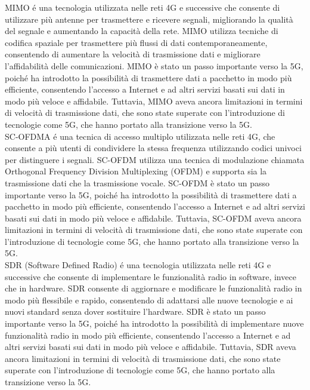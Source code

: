 MIMO é una tecnologia utilizzata nelle reti 4G e successive che consente di utilizzare più antenne per trasmettere e ricevere segnali, migliorando la qualità del segnale e aumentando la capacità della rete. MIMO utilizza tecniche di codifica spaziale per trasmettere più flussi di dati contemporaneamente, consentendo di aumentare la velocità di trasmissione dati e migliorare l'affidabilità delle comunicazioni. MIMO è stato un passo importante verso la 5G, poiché ha introdotto la possibilità di trasmettere dati a pacchetto in modo più efficiente, consentendo l'accesso a Internet e ad altri servizi basati sui dati in modo più veloce e affidabile. Tuttavia, MIMO aveva ancora limitazioni in termini di velocità di trasmissione dati, che sono state superate con l'introduzione di tecnologie come 5G, che hanno portato alla transizione verso la 5G.\\
SC-OFDMA é una tecnica di accesso multiplo utilizzata nelle reti 4G, che consente a più utenti di condividere la stessa frequenza utilizzando codici univoci per distinguere i segnali. SC-OFDM utilizza una tecnica di modulazione chiamata Orthogonal Frequency Division Multiplexing (OFDM) e supporta sia la trasmissione dati che la trasmissione vocale. SC-OFDM è stato un passo importante verso la 5G, poiché ha introdotto la possibilità di trasmettere dati a pacchetto in modo più efficiente, consentendo l'accesso a Internet e ad altri servizi basati sui dati in modo più veloce e affidabile. Tuttavia, SC-OFDM aveva ancora limitazioni in termini di velocità di trasmissione dati, che sono state superate con l'introduzione di tecnologie come 5G, che hanno portato alla transizione verso la 5G.\\
SDR (Software Defined Radio) é una tecnologia utilizzata nelle reti 4G e successive che consente di implementare le funzionalità radio in software, invece che in hardware. SDR consente di aggiornare e modificare le funzionalità radio in modo più flessibile e rapido, consentendo di adattarsi alle nuove tecnologie e ai nuovi standard senza dover sostituire l'hardware. SDR è stato un passo importante verso la 5G, poiché ha introdotto la possibilità di implementare nuove funzionalità radio in modo più efficiente, consentendo l'accesso a Internet e ad altri servizi basati sui dati in modo più veloce e affidabile. Tuttavia, SDR aveva ancora limitazioni in termini di velocità di trasmissione dati, che sono state superate con l'introduzione di tecnologie come 5G, che hanno portato alla transizione verso la 5G.\\
